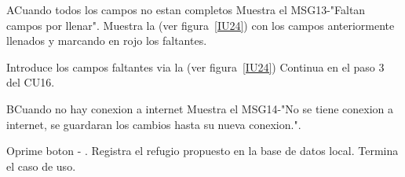 \begin{UCtrayectoriaA}{A}{Cuando todos los campos no estan completos}
	\UCpaso Muestra el MSG13-"Faltan campos por llenar".
	\UCpaso Muestra la (ver figura~\ref{IU24}) con los campos anteriormente llenados y marcando en rojo los faltantes.
	\item\UCactor Introduce los campos faltantes via la (ver figura~\ref{IU24})
	\UCpaso Continua en el paso 3 del CU16.
\end{UCtrayectoriaA}

\begin{UCtrayectoriaA}{B}{Cuando no hay conexion a internet}
	\UCpaso Muestra el MSG14-"No se tiene conexion a internet, se guardaran los cambios hasta su nueva conexion.".
	\item\UCactor Oprime boton - .
	\UCpaso Registra el refugio propuesto  en la base de datos local.	
	\UCpaso[] Termina el caso de uso.
\end{UCtrayectoriaA}
 